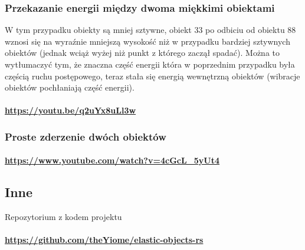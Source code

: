 \documentclass[12pt, letterpaper]{report}
\begin{document}
    \subsubsection{Przekazanie energii między dwoma miękkimi obiektami}
    W tym przypadku obiekty są mniej sztywne,
    obiekt 33 po odbiciu od obiektu 88 wznosi się na wyraźnie mniejszą wysokość niż w przypadku bardziej sztywnych obiektów
    (jednak wciąż wyżej niż punkt z którego zaczął spadać). Można to wytłumaczyć tym,
    że znaczna część energii która w poprzednim przypadku była częścią ruchu postępowego,
    teraz stała się energią wewnętrzną obiektów (wibracje obiektów pochłaniają część energii).

    \paragraph{
        \url{https://youtu.be/q2uYx8uLl3w}
    }

    \subsubsection{Proste zderzenie dwóch obiektów}
    \paragraph{
        \url{https://www.youtube.com/watch?v=4cGcL_5yUt4}
    }

    \subsection{Inne}
    Repozytorium z kodem projektu
    \paragraph{
        \url{https://github.com/theYiome/elastic-objects-rs}
}
\end{document}

